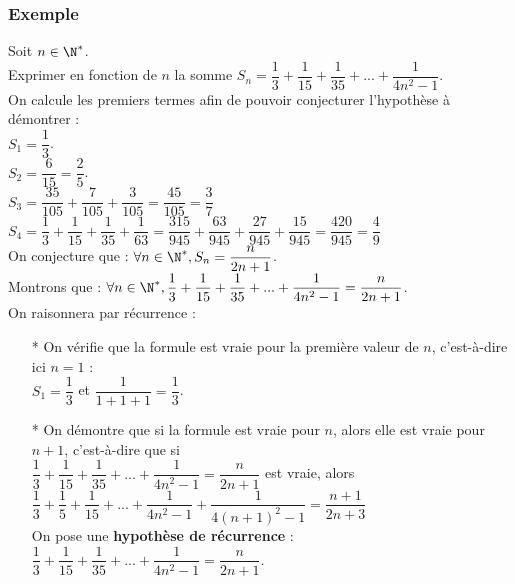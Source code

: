 \newpage

\subsubsection{Exemple }

Soit $n \in \N^*$. \\

Exprimer en fonction de $n$ la somme $S_n = \dfrac{1}{3} + \dfrac{1}{15} + \dfrac{1}{35} + ... + \dfrac{1}{4n^2 - 1}$. \\

On calcule les premiers termes afin de pouvoir conjecturer l'hypothèse à démontrer : \\

$S_1 = \dfrac{1}{3}$. \\

$S_2 = \dfrac{6}{15} = \dfrac{2}{5}$. \\

$S_3 = \dfrac{35}{105} + \dfrac{7}{105} + \dfrac{3}{105} = \dfrac{45}{105} = \dfrac{3}{7}$ \\

$S_4 = \dfrac{1}{3} + \dfrac{1}{15} + \dfrac{1}{35} + \dfrac{1}{63} = \dfrac{315}{945} + \dfrac{63}{945} + \dfrac{27}{945} + \dfrac{15}{945} = \dfrac{420}{945} = \dfrac{4}{9}$ \\

On conjecture que : $\forall n \in \N^*, S_n = \dfrac{n}{2n+1}$. \\

Montrons que : $\forall n \in \N^*, \dfrac{1}{3} + \dfrac{1}{15} + \dfrac{1}{35} + ... + \dfrac{1}{4n^2 - 1} = \dfrac{n}{2n+1}$. \\

On raisonnera par récurrence : \\

\begin{itemize}

\item[*] On vérifie que la formule est vraie pour la première valeur de $n$, c'est-à-dire ici $n = 1$ : \vspace{.3cm} \\ $S_1 = \dfrac{1}{3}$ et $\dfrac{1}{1+ 1 + 1} = \dfrac{1}{3}$. \\

\item[*] On démontre que si la formule est vraie pour $n$, alors elle est vraie pour $n+1$, c'est-à-dire que si \\ $\dfrac{1}{3} + \dfrac{1}{15} + \dfrac{1}{35} + ... + \dfrac{1}{4n^2 - 1} = \dfrac{n}{2n+1}$ est vraie, alors $ \dfrac{1}{3} + \dfrac{1}{5} + \dfrac{1}{15} + ... + \dfrac{1}{4n^2 - 1} + \dfrac{1}{4\left(n+1\right)^2 - 1} = \dfrac{n+1}{2n + 3}$ \vspace{.3cm} \\ On pose une \textbf{hypothèse de récurrence} : $\dfrac{1}{3} + \dfrac{1}{15} + \dfrac{1}{35} + ... + \dfrac{1}{4n^2 - 1} = \dfrac{n}{2n+1}$.
\end{itemize}

